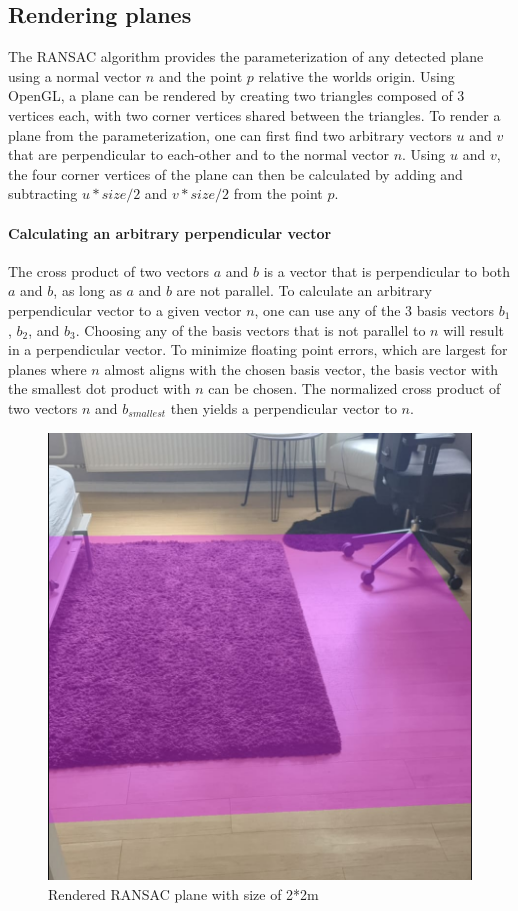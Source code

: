 \subsection{Rendering planes}
The RANSAC algorithm provides the parameterization of any detected plane using a normal vector $n$ and the point $p$ relative the worlds origin.
Using OpenGL, a plane can be rendered by creating two triangles composed of 3 vertices each, with two corner vertices shared between the triangles.
To render a plane from the parameterization, one can first find two arbitrary vectors $u$ and $v$
that are perpendicular to each-other and to the normal vector $n$.
Using $u$ and $v$, the four corner vertices of the plane can then be calculated by adding and subtracting $u * size / 2$ and $v * size / 2$ from the point $p$.

\paragraph{Calculating an arbitrary perpendicular vector}
The cross product of two vectors $a$ and $b$ is a vector that is perpendicular to both $a$ and $b$,
as long as $a$ and $b$ are not parallel.
To calculate an arbitrary perpendicular vector to a given vector $n$, one can use any of the 3 basis vectors ${b_1}$, ${b_2}$, and ${b_3}$.
Choosing any of the basis vectors that is not parallel to $n$ will result in a perpendicular vector.
To minimize floating point errors, which are largest for planes where $n$ almost aligns with the chosen basis vector,
the basis vector with the smallest dot product with $n$ can be chosen.
The normalized cross product of two vectors $n$ and $b_{smallest}$ then yields a perpendicular vector to $n$.

\begin{figure}[ht!]
    \centering
    \includegraphics[width=0.5\linewidth]{images/renderedPlane}
    \caption{Rendered RANSAC plane with size of 2*2m}
\end{figure}

